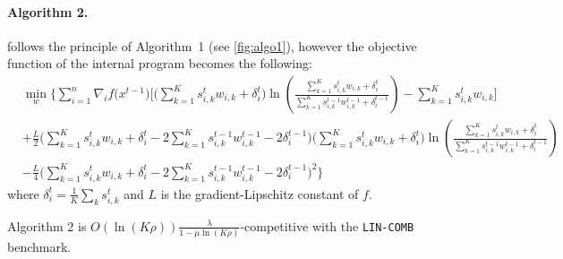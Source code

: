 \paragraph{Algorithm 2.} \label{algo-convex} follows the principle of Algorithm~1 (see \cref{fig:algo1}), however the objective function of the internal program becomes the following:
\begin{align*}
&\min_{w} \biggl\{\sum_{i=1}^{n}
\nabla_{i} f\bigl(x^{t-1} \bigr) \biggl[  \biggl(\sum_{k=1}^{K} s_{i,k}^{t} w_{i,k}  + \delta_{i}^{t} \biggr)
\ln \left(\frac{ \sum_{k=1}^{K} s_{i,k}^{t} w_{i,k}  + \delta_{i}^{t} }{\sum_{k=1}^{K} s_{i,k}^{t-1} w_{i,k}^{t-1} + \delta_{i}^{t-1}}\right)
- \sum_{k=1}^{K}  s_{i,k}^{t} w_{i,k} \biggr] \\
%
&+ \frac{L}{2}\biggl( \sum_{k=1}^{K} s_{i,k}^{t} w_{i,k} + \delta_{i}^{t}  - 2\sum_{k=1}^{K} s_{i,k}^{t-1} w_{i,k}^{t-1} - 2\delta_{i}^{t-1} \biggr) \biggl(\sum_{k=1}^{K} s_{i,k}^{t} w_{i,k} + \delta_{i}^{t} \biggr)
\ln \left(\frac{ \sum_{k=1}^{K} s_{i,k}^{t} w_{i,k}  + \delta_{i}^{t} }{\sum_{k=1}^{K} s_{i,k}^{t-1} w_{i,k}^{t-1}  + \delta_{i}^{t-1}}\right) \\
%
&- \frac{L}{4} \biggl( \sum_{k=1}^{K} s_{i,k}^{t} w_{i,k} + \delta_{i}^{t}  - 2\sum_{k=1}^{K} s_{i,k}^{t-1} w_{i,k}^{t-1} - 2\delta_{i}^{t-1} \biggr)^{2}
\biggr\}
\end{align*}
where $\delta_{i}^{t} = \frac{1}{K} \sum_{k} s_{i,k}^{t}$ and $L$ is the gradient-Lipschitz constant of $f$.

\begin{theorem} \label{convex-covering-theorem}
Algorithm 2 is $O(\ln(K \rho)) \frac{\lambda}{1 - \mu \ln (K\rho)}$-competitive with the \texttt{LIN-COMB} benchmark.
\end{theorem}
